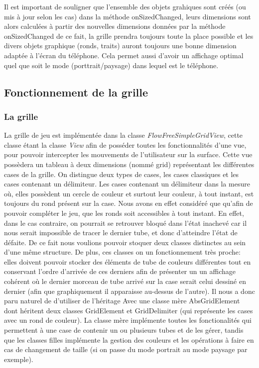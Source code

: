 \documentclass[12pt, a4paper]{article}%
\begin{document}
    Il est important de souligner que l'ensemble des objets grahiques sont créés (ou mis à jour selon les cas) dans la méthode
    onSizedChanged, leurs dimensions sont alors calculées à partir des nouvelles dimensions données par la méthode onSizedChanged
    de ce fait, la grille prendra toujours toute la place possible et les divers objets graphique (ronds, traits) auront toujours
    une bonne dimension adaptée à l'écran du téléphone. Cela permet aussi d'avoir un affichage optimal quel que soit le mode
    (porttrait/paysage) dans lequel est le téléphone.
    \subsection{Fonctionnement de la grille}
    \subsubsection{La grille}
    La grille de jeu est implémentée dans la classe \textit{FlowFreeSimpleGridView}, cette classe étant la classe \textit{View}
afin de posséder toutes les fonctionnalités d'une vue, pour pouvoir intercepter les mouvements de l'utilisateur sur la surface.
Cette vue possèdera un tableau à deux dimensions (nommé grid) représentant les différentes cases de la grille. On distingue deux
types de cases, les cases classiques et les cases contenant un délimiteur. Les cases contenant un délimiteur dans la mesure où,
elles possèdent un cercle de couleur et surtout leur couleur, à tout instant, est toujours du rond présent sur la case. Nous avons
en effet considéré que qu'afin de pouvoir compléter le jeu, que les ronds soit accessibles à tout instant. En effet, dans le cas
contraire, on pourrait se retrouver bloqué dans l'état inachevé car il nous serait impossible de tracer le dernier tube, et donc
d'atteindre l'état de défaite. De ce fait nous voulions pouvoir stoquer deux classes distinctes au sein d'une même structure. De
plus, ces classes on un fonctionnement très proche: elles doivent pouvoir stocker des éléments de tube de couleurs différentes
tout en conservant l'ordre d'arrivée de ces derniers afin de présenter un un affichage cohérent où le dernier morceau de tube
arrivé sur la case serait celui dessiné en dernier (afin que graphiquement il apparaisse au-dessus de l'autre). Il nous a donc
paru naturel de d'utiliser de l'héritage Avec une classe mère AbsGridElement dont héritent deux classes GridElement et
GridDelimiter (qui représente les cases avec un rond de couleur). La classe mère implémente toutes les fonctionalités qui
permettent à une case de contenir un ou plusieurs tubes et de les gérer, tandis que les classes filles implémente la gestion des
couleurs et les opérations à faire en cas de changement de taille (si on passe du mode portrait au mode paysage par exemple).
\end{document}
